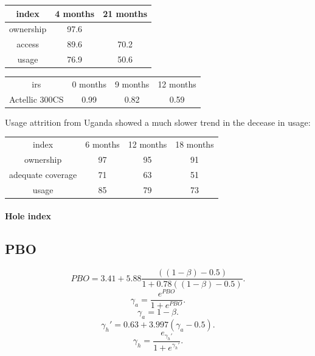 \documentclass[a4paper, 12pt, twoside]{article}
\begin{document}
\begin{center}
	\begin{tabular}{c c c}
		\toprule
		index     & 4 months & 21 months \\
		\midrule
		ownership & 97.6     &           \\
		access    & 89.6     & 70.2      \\
		usage     & 76.9     & 50.6      \\
		\bottomrule
	\end{tabular}
\end{center}

\begin{center}
	\begin{tabular}{c c c c}
		\gls{irs}      & 0 months & 9 months & 12 months \\
		Actellic 300CS & 0.99     & 0.82     & 0.59      \\
	\end{tabular}
\end{center}

Usage attrition from Uganda\cite{Staedke2020} showed a much slower trend in the decease in usage:

\begin{center}
	\begin{tabular}{c c c c}
		index             & 6 months & 12 months & 18 months \\
		ownership         & 97       & 95        & 91        \\
		adequate coverage & 71       & 63        & 51        \\
		usage             & 85       & 79        & 73
	\end{tabular}
\end{center}

\paragraph{Hole index}%
\label{par:hole_index}


\subsection{PBO}

\[
	PBO = 3.41 + 5.88 \frac{((1-\beta) - 0.5)}{1 + 0.78 ((1-\beta) - 0.5)}
	.\]
\[
	\gamma_a = \frac{e^{PBO}}{1 + e^{PBO}}
	.\]
\[
	\gamma_a = 1 - \beta
	.\]
\[
	\gamma_h' = 0.63 + 3.997 ( \gamma_a - 0.5 )
	.\]
\[
	\gamma_h = \frac{e_{\gamma_h'}}{1+e^{\gamma_h'}}
	.\]
\end{document}
